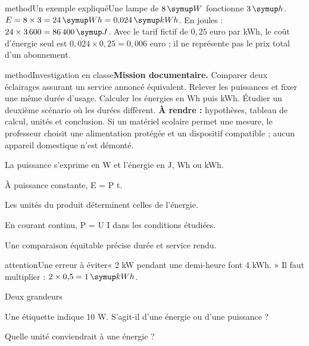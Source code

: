 \begin{pcEncadre}{method}{Un exemple expliqué}Une lampe de $8\unite W$ fonctionne $3\unite h$. $E=8\times3=24\unite{Wh}=0{,}024\unite{kWh}$. En joules : $24\times3\,600=86\,400\unite J$. Avec le tarif fictif de $0{,}25$ euro par kWh, le coût d’énergie seul est $0{,}024\times0{,}25=0{,}006$ euro ; il ne représente pas le prix total d’un abonnement.\end{pcEncadre}
\label{activite-17}
\begin{pcEncadre}{method}{Investigation en classe}\textbf{Mission documentaire.} Comparer deux éclairages assurant un service annoncé équivalent. Relever les puissances et fixer une même durée d’usage. Calculer les énergies en Wh puis kWh. Étudier un deuxième scénario où les durées diffèrent. \textbf{À rendre :} hypothèses, tableau de calcul, unités et conclusion. Si un matériel scolaire permet une mesure, le professeur choisit une alimentation protégée et un dispositif compatible ; aucun appareil domestique n’est démonté.\end{pcEncadre}
\begin{questions}
\item La puissance s’exprime en W et l’énergie en J, Wh ou kWh.
\item À puissance constante, E = P t.
\item Les unités du produit déterminent celles de l’énergie.
\item En courant continu, P = U I dans les conditions étudiées.
\item Une comparaison équitable précise durée et service rendu.
\end{questions}
\begin{pcEncadre}{attention}{Une erreur à éviter}« 2 kW pendant une demi-heure font 4 kWh. » Il faut multiplier : $2\times0{,}5=1\unite{kWh}$.\end{pcEncadre}
\pcGrille
\clearpage{}
\par\noindent\begin{minipage}{\linewidth}
\begin{exercice}[1]{Deux grandeurs}
\begin{questions}
\item Une étiquette indique 10 W. S’agit-il d’une énergie ou d’une puissance ?
\item Quelle unité conviendrait à une énergie ?
\end{questions}
\end{exercice}
\end{minipage}
